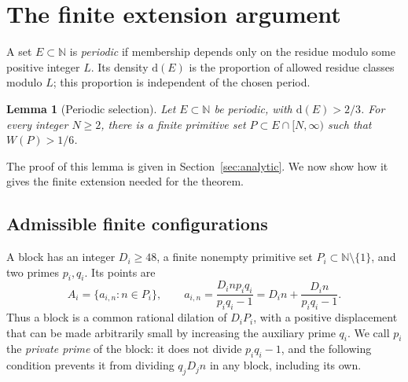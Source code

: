 \documentclass[11pt,reqno]{amsart}
\newtheorem{lemma}[theorem]{Lemma}
\theoremstyle{definition}
\theoremstyle{remark}
\numberwithin{equation}{section}
\newcommand{\N}{\mathbb N}
\newcommand{\dens}{\mathrm d}
\begin{document}
\section{The finite extension argument}
\label{sec:construction}
A set $E\subset\N$ is \emph{periodic} if membership depends only on the
residue modulo some positive integer $L$. Its density $\dens(E)$ is the
proportion of allowed residue classes modulo $L$; this proportion is
independent of the chosen period.

\begin{lemma}[Periodic selection]\label{thm:selection}
Let $E\subset\N$ be periodic, with $\dens(E)>2/3$. For every integer
$N\geq2$, there is a finite primitive set
$P\subset E\cap[N,\infty)$ such that $W(P)>1/6$.
\end{lemma}

The proof of this lemma is given in Section~\ref{sec:analytic}. We now
show how it gives the finite extension needed for the theorem.

\subsection{Admissible finite configurations}

A block has an integer $D_i\geq48$, a finite nonempty primitive set
$P_i\subset\N\setminus\{1\}$, and two primes $p_i,q_i$. Its points are
\begin{equation}\label{eq:block-data}
 A_i=\{a_{i,n}:n\in P_i\},\qquad
 a_{i,n}=\frac{D_i n p_iq_i}{p_iq_i-1}
        =D_i n+\frac{D_i n}{p_iq_i-1}.
\end{equation}
Thus a block is a common rational dilation of $D_iP_i$, with a positive
displacement that can be made arbitrarily small by increasing the
auxiliary prime $q_i$. We call $p_i$ the \emph{private prime} of the
block: it does not divide $p_iq_i-1$, and the following condition
prevents it from dividing $q_jD_jn$ in any block, including its own.
\end{document}
